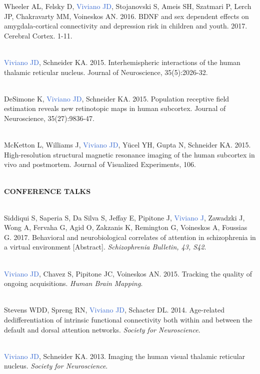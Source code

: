 \documentclass[a4paper,11pt,oneside]{book}
\newcommand\sectionheading{
    \normalsize
    \noindent
    \leftskip=0in
    \textbf
}
\begin{document}
\begin{flushleft}
Wheeler AL, Felsky D, \textcolor{highlight}{Viviano JD}, Stojanovski S, Ameis SH, Szatmari P, Lerch JP, Chakravarty MM, Voineskos AN. 2016. BDNF and sex dependent effects on amygdala-cortical connectivity and depression risk in children and youth. 2017. Cerebral Cortex. 1-11. \\\

\textcolor{highlight}{Viviano JD}, Schneider KA. 2015. Interhemispheric interactions of the human thalamic reticular nucleus. Journal of Neuroscience, 35(5):2026-32. \\\

DeSimone K, \textcolor{highlight}{Viviano JD}, Schneider KA. 2015. Population receptive field estimation reveals new retinotopic maps in human subcortex. Journal of Neuroscience, 35(27):9836-47. \\\

McKetton L, Williams J, \textcolor{highlight}{Viviano JD}, Yücel YH, Gupta N, Schneider KA. 2015. High-resolution structural magnetic resonance imaging of the human subcortex in vivo and postmortem. Journal of Visualized Experiments, 106. \\\

\sectionheading{CONFERENCE TALKS} \\\

Siddiqui S, Saperia S, Da Silva S, Jeffay E, Pipitone J, \textcolor{highlight}{Viviano J}, Zawadzki J, Wong A, Fervaha G, Agid O, Zakzanis K, Remington G, Voineskos A, Foussias G. 2017. Behavioral and neurobiological correlates of attention in schizophrenia in a virtual environment [Abstract]. \textit{Schizophrenia Bulletin, 43, S42}. \\\

\textcolor{highlight}{Viviano JD}, Chavez S, Pipitone JC, Voineskos AN. 2015. Tracking the quality of ongoing acquisitions. \textit{Human Brain Mapping}. \\\

Stevens WDD, Spreng RN, \textcolor{highlight}{Viviano JD}, Schacter DL. 2014. Age-related dedifferentiation of intrinsic functional connectivity both within and between the default and dorsal attention networks. \textit{Society for Neuroscience}. \\\

\textcolor{highlight}{Viviano JD}, Schneider KA. 2013. Imaging the human visual thalamic reticular nucleus. \textit{Society for Neuroscience}. \\\


\end{flushleft}
\end{document}
